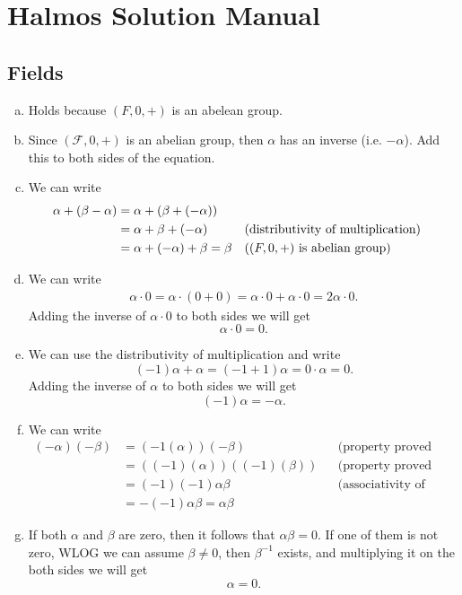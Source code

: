 \chapter{Halmos Solution Manual}


\section{Fields}


\begin{problem}
	\begin{solution}
		\begin{enumerate}[(a)]
			\item Holds because $ (F,0,+) $ is an abelean group.
			\item Since $ (\mathcal{F},0,+) $ is an abelian group, then $ \alpha $ has an inverse (i.e. $ -\alpha $). Add this to both sides of the equation.
			\item We can write
			\begin{align*}
				\alpha + (\beta - \alpha) &= \alpha + (\beta + (-\alpha)) \\
				&= \alpha + \beta + (-\alpha) && \text{(distributivity of multiplication)} \\
				&= \alpha + (-\alpha) + \beta = \beta && \text{($ (F,0,+) $ is abelian group)}
			\end{align*}
			\item We can write
			\begin{align*}
				\alpha\cdot0 = \alpha \cdot (0 + 0) = \alpha\cdot 0 + \alpha\cdot 0 = 2\alpha\cdot 0.
			\end{align*}
			Adding the inverse of $ \alpha\cdot 0 $ to both sides we will get
			\[ \alpha\cdot0 = 0. \]
			\item We can use the distributivity of multiplication and write
			\[ (-1)\alpha + \alpha = (-1 + 1)\alpha = 0\cdot\alpha = 0. \]
			Adding the inverse of $ \alpha $ to both sides we will get
			\[ (-1)\alpha = -\alpha. \]
			
			\item We can write
			\begin{align*}
				(-\alpha)(-\beta) &= (-1(\alpha))(-\beta)  && \text{(property proved above)} \\
				&= ((-1)(\alpha))((-1)(\beta)) && \text{(property proved above)} \\
				&= (-1)(-1)\alpha\beta && \text{(associativity of product)} \\
				&= -(-1 )\alpha \beta = \alpha\beta
			\end{align*}
			
			\item If both $ \alpha $ and $ \beta $ are zero, then it follows that $ \alpha\beta = 0 $. If one of them is not zero, WLOG we can assume $ \beta \neq 0 $, then $ \beta^{-1} $ exists, and multiplying it on the both sides we will get 
			\[ \alpha = 0. \]
		\end{enumerate}
	\end{solution}
\end{problem}


